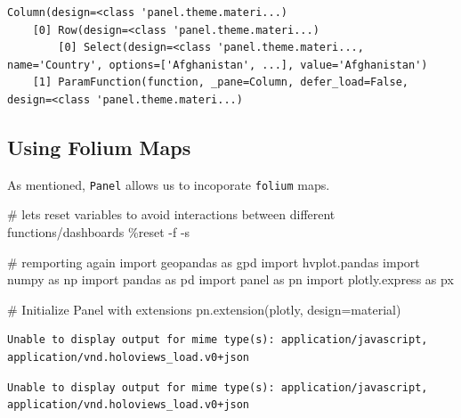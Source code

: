 \documentclass[
  letterpaper,
  DIV=11,
  numbers=noendperiod]{scrreprt}
\newenvironment{Shaded}{\begin{snugshade}}{\end{snugshade}}
\newcommand{\CommentTok}[1]{\textcolor[rgb]{0.37,0.37,0.37}{#1}}
\newcommand{\ImportTok}[1]{\textcolor[rgb]{0.00,0.46,0.62}{#1}}
\newcommand{\NormalTok}[1]{\textcolor[rgb]{0.00,0.23,0.31}{#1}}
\newcommand{\OperatorTok}[1]{\textcolor[rgb]{0.37,0.37,0.37}{#1}}
\newcommand{\StringTok}[1]{\textcolor[rgb]{0.13,0.47,0.30}{#1}}
\begin{document}
\begin{verbatim}
Column(design=<class 'panel.theme.materi...)
    [0] Row(design=<class 'panel.theme.materi...)
        [0] Select(design=<class 'panel.theme.materi..., name='Country', options=['Afghanistan', ...], value='Afghanistan')
    [1] ParamFunction(function, _pane=Column, defer_load=False, design=<class 'panel.theme.materi...)
\end{verbatim}

\hypertarget{using-folium-maps}{%
\subsection{Using Folium Maps}\label{using-folium-maps}}

As mentioned, \texttt{Panel} allows us to incoporate \texttt{folium}
maps.

\begin{Shaded}
\begin{Highlighting}[]
\CommentTok{\# let\textquotesingle{}s reset variables to avoid interactions between different functions/dashboards}
\OperatorTok{\%}\NormalTok{reset }\OperatorTok{{-}}\NormalTok{f }\OperatorTok{{-}}\NormalTok{s}

\CommentTok{\# remporting again}
\ImportTok{import}\NormalTok{ geopandas }\ImportTok{as}\NormalTok{ gpd}
\ImportTok{import}\NormalTok{ hvplot.pandas}
\ImportTok{import}\NormalTok{ numpy }\ImportTok{as}\NormalTok{ np}
\ImportTok{import}\NormalTok{ pandas }\ImportTok{as}\NormalTok{ pd}
\ImportTok{import}\NormalTok{ panel }\ImportTok{as}\NormalTok{ pn}
\ImportTok{import}\NormalTok{ plotly.express }\ImportTok{as}\NormalTok{ px}

\CommentTok{\# Initialize Panel with extensions}
\NormalTok{pn.extension(}\StringTok{\textquotesingle{}plotly\textquotesingle{}}\NormalTok{, design}\OperatorTok{=}\StringTok{\textquotesingle{}material\textquotesingle{}}\NormalTok{)}
\end{Highlighting}
\end{Shaded}

\begin{verbatim}
Unable to display output for mime type(s): application/javascript, application/vnd.holoviews_load.v0+json
\end{verbatim}

\begin{verbatim}
Unable to display output for mime type(s): application/javascript, application/vnd.holoviews_load.v0+json
\end{verbatim}
\end{document}
